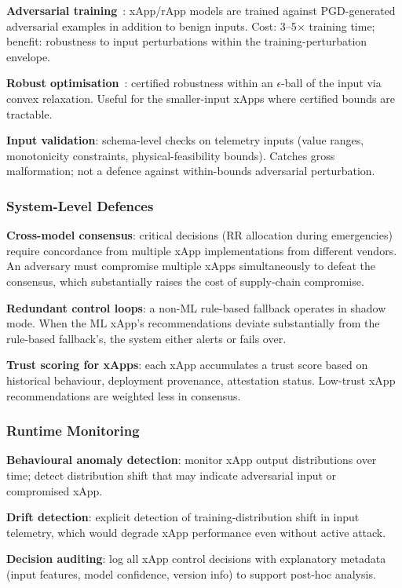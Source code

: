 \documentclass[sigconf,nonacm]{acmart}
\begin{document}
\textbf{Adversarial training}~\cite{madry2018towards}: xApp/rApp
models are trained against PGD-generated adversarial examples in
addition to benign inputs. Cost: 3--5$\times$ training time;
benefit: robustness to input perturbations within the
training-perturbation envelope.

\textbf{Robust optimisation}~\cite{wong2018robust}: certified
robustness within an $\epsilon$-ball of the input via convex
relaxation. Useful for the smaller-input xApps where certified
bounds are tractable.

\textbf{Input validation}: schema-level checks on telemetry inputs
(value ranges, monotonicity constraints, physical-feasibility
bounds). Catches gross malformation; not a defence against
within-bounds adversarial perturbation.

\subsubsection{System-Level Defences}

\textbf{Cross-model consensus}: critical decisions (RR allocation
during emergencies) require concordance from multiple xApp
implementations from different vendors. An adversary must compromise
multiple xApps simultaneously to defeat the consensus, which
substantially raises the cost of supply-chain compromise.

\textbf{Redundant control loops}: a non-ML rule-based fallback
operates in shadow mode. When the ML xApp's recommendations
deviate substantially from the rule-based fallback's, the system
either alerts or fails over.

\textbf{Trust scoring for xApps}: each xApp accumulates a trust
score based on historical behaviour, deployment provenance,
attestation status. Low-trust xApp recommendations are weighted
less in consensus.

\subsubsection{Runtime Monitoring}

\textbf{Behavioural anomaly detection}: monitor xApp output
distributions over time; detect distribution shift that may
indicate adversarial input or compromised xApp.

\textbf{Drift detection}: explicit detection of training-distribution
shift in input telemetry, which would degrade xApp performance
even without active attack.

\textbf{Decision auditing}: log all xApp control decisions with
explanatory metadata (input features, model confidence, version
info) to support post-hoc analysis.
\end{document}

